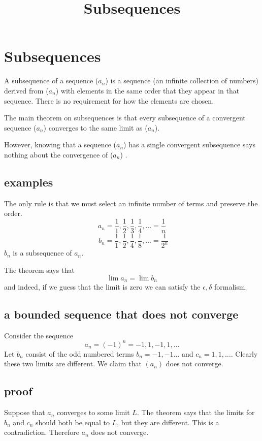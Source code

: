 \documentclass[11pt, oneside]{article}
\title{Subsequences}
\date{}
\begin{document}
\maketitle
\Large

\section{Subsequences}

A subsequence of a sequence ($a_n$) is a sequence (an infinite collection of numbers) derived from ($a_n$) with elements in the same order that they appear in that sequence.  There is no requirement for how the elements are chosen.

The main theorem on subsequences is that every subsequence of a convergent sequence ($a_n$) converges to the same limit as ($a_n$).

However, knowing that a sequence ($a_n$)  has a single convergent subsequence says nothing about the convergence of ($a_n$) .

\subsection*{examples}

The only rule is that we must select an infinite number of terms and preserve the order.
\[ a_n = \frac{1}{1}, \frac{1}{2}, \frac{1}{3}, \frac{1}{4}, \dots = \frac{1}{n} \]
\[ \ \ b_n = \frac{1}{1}, \frac{1}{2}, \frac{1}{4}, \frac{1}{8}, \dots = \frac{1}{2^n} \]
$b_n$ is a subsequence of $a_n$.

The theorem says that 
\[ \lim a_n = \lim b_n \] 
and indeed, if we guess that the limit is zero we can satisfy the $\epsilon, \delta$ formalism.

\subsection*{a bounded sequence that does not converge}

Consider the sequence 
\[ a_n = (-1)^n  = -1, 1, -1, 1, \dots \]
Let $b_n$ consist of the odd numbered terms $b_n = -1, -1 \dots$ and $c_n = 1,1, \dots$.  Clearly these two limits are different.  We claim that $(a_n)$ does not converge.

\subsection*{proof}

Suppose that $a_n$ converges to some limit $L$.  The theorem says that the limits for $b_n$ and $c_n$ should both be equal to $L$, but they are different.  This is a contradiction.  Therefore $a_n$ does not converge.
\end{document}
